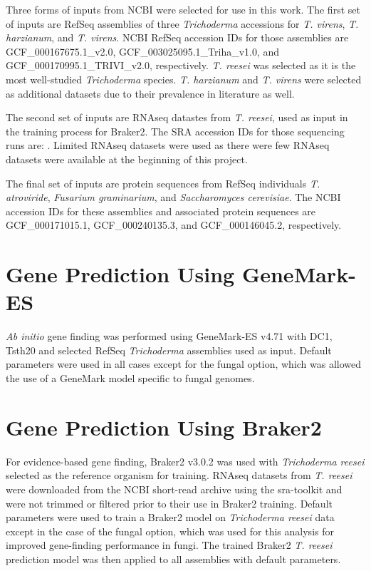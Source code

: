 Three forms of inputs from NCBI were selected for use in this
work. The first set of inputs are RefSeq assemblies of three
\textit{Trichoderma} accessions for \textit{T. virens},
\textit{T. harzianum}, and \textit{T. virens}. NCBI RefSeq accession
IDs for those assemblies are GCF\_000167675.1\_v2.0,
GCF\_003025095.1\_Triha\_v1.0, and GCF\_000170995.1\_TRIVI\_v2.0,
respectively. \textit{T. reesei} was selected as it is the most
well-studied \textit{Trichoderma} species. \textit{T. harzianum} and
\textit{T. virens} were selected as additional datasets due to their
prevalence in literature as well.

The second set of inputs are RNAseq datastes from \textit{T. reesei},
used as input in the training process for Braker2. The SRA accession
IDs for those sequencing runs are: . Limited RNAseq datasets were used
as there were few RNAseq datasets were available at the beginning of
this project.

The final set of inputs are protein sequences from RefSeq individuals
\textit{T. atroviride}, \textit{Fusarium graminarium}, and
\textit{Saccharomyces cerevisiae}. The NCBI accession IDs for these
assemblies and associated protein sequences are GCF\_000171015.1,
GCF\_000240135.3, and GCF\_000146045.2, respectively.

\section{Gene Prediction Using GeneMark-ES}
\label{met:genemark}

\textit{Ab initio} gene finding was performed using GeneMark-ES
v4.71\cite{Borodovsky2011} with DC1, Tsth20 and selected RefSeq
\textit{Trichoderma} assemblies used as input. Default parameters were
used in all cases except for the fungal option, which was allowed the
use of a GeneMark model specific to fungal genomes.

%

\section{Gene Prediction Using Braker2}
\label{met:braker2}

For evidence-based gene finding, Braker2 v3.0.2\cite{Bruna2021} was
used with \textit{Trichoderma reesei} selected as the reference
organism for training. RNAseq datasets from \textit{T. reesei} were
downloaded from the NCBI short-read archive using the
sra-toolkit\cite{NCBI2025} and were not trimmed or filtered prior to
their use in Braker2 training. Default parameters were used to train a
Braker2 model on \textit{Trichoderma reesei} data except in the case
of the fungal option, which was used for this analysis for improved
gene-finding performance in fungi. The trained Braker2
\textit{T. reesei} prediction model was then applied to all assemblies
with default parameters.


